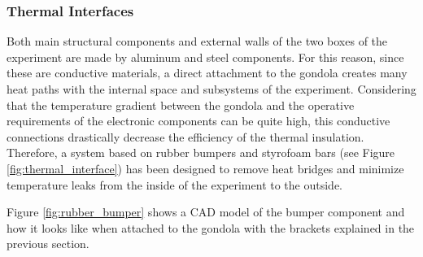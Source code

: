 \subsubsection{Thermal Interfaces}
\label{sec:4.2.2}

Both main structural components and external walls of the two boxes of the experiment are made by aluminum and steel components. For this reason, since these are conductive materials, a direct attachment to the gondola creates many heat paths with the internal space and subsystems of the experiment. Considering that the temperature gradient between the gondola and the operative requirements of the electronic components can be quite high, this conductive connections drastically decrease the efficiency of the thermal insulation. Therefore, a system based on rubber bumpers and styrofoam bars (see Figure \ref{fig:thermal_interface}) has been designed to remove heat bridges and minimize temperature leaks from the inside of the experiment to the outside.

Figure \ref{fig:rubber_bumper} shows a CAD model of the bumper component and how it looks like when attached to the gondola with the brackets explained in the previous section.

